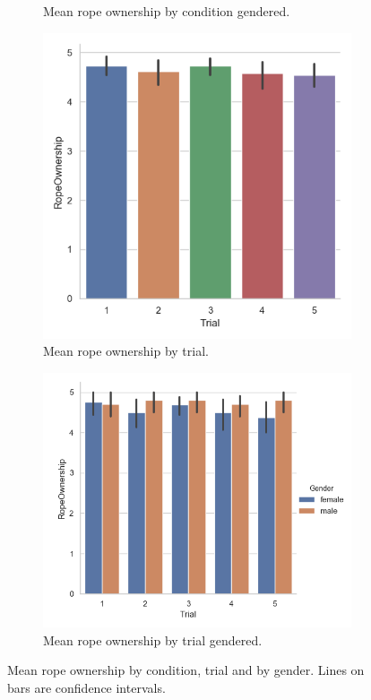 \begin{figure}[H]
\begin{subfigure}[b]{0.5\textwidth}
     \caption{Mean rope ownership by condition gendered.}
     \label{fig:ropeOwnCondGend}
 \end{subfigure}
  \begin{subfigure}[b]{0.5\textwidth}
     \centering
     \includegraphics[scale=0.5]{Files/Plots/ropeOwnership_by_trial.png}
     \caption{Mean rope ownership by trial.}
     \label{fig:ropeOwnTrial}
 \end{subfigure}
     \begin{subfigure}[b]{0.5\textwidth}
     \centering
     \includegraphics[scale=0.5]{Files/Plots/ropeOwnership_by_trial_gen.png}
     \caption{Mean rope ownership by trial gendered.}
     \label{fig:ropeOwnTrialGen}
 \end{subfigure}
     \caption{Mean rope ownership by condition, trial and by gender. Lines on bars are confidence intervals.}
    \label{fig:ropeOwn}
\end{figure}


